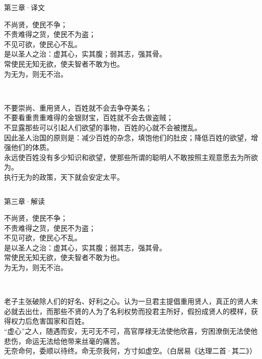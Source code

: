 \documentclass{beamer}
\newcommand{\classical}[1]{\textcolor{classical}{\kaishu #1}}         %
\newcommand{\trans}[1]{\textcolor{trans}{\fangsong #1}}              %
\newcommand{\comment}[1]{\textcolor{comment}{\kaishu #1}}            %
\newcommand{\originaltext}[1]{
	\begin{center}
		\large\classical{#1}
	\end{center}
	}
\begin{document}
\begin{frame}{第三章·译文}
	\originaltext{
	不尚贤，使民不争；\\
	不贵难得之货，使民不为盗；\\
	不见可欲，使民心不乱。\\
	是以圣人之治：虚其心，实其腹；弱其志，强其骨。\\
	常使民无知无欲，使夫智者不敢为也。\\
	为无为，则无不治。
	}
	\begin{columns}[T]
		\trans{\setlength{\parindent}{2em}\\
		不要崇尚、重用贤人，百姓就不会去争夺美名；\\
		不要看重贵重难得的金银财宝，百姓就不会去做盗贼；\\
		不显露那些可以引起人们欲望的事物，百姓的心就不会被搅乱。\\
		因此圣人治国的原则是：减少百姓的杂念，填饱他们的肚皮；降低百姓的欲望，增强他们的体质。\\
		永远使百姓没有多少知识和欲望，使那些所谓的聪明人不敢按照主观意愿去为所欲为。\\
		执行无为的政策，天下就会安定太平。
		}
	\end{columns}
\end{frame}

\begin{frame}{第三章·解读}
	\originaltext{
	不尚贤，使民不争；\\
	不贵难得之货，使民不为盗；\\
	不见可欲，使民心不乱。\\
	是以圣人之治：虚其心，实其腹；弱其志，强其骨。\\
	常使民无知无欲，使夫智者不敢为也。\\
	为无为，则无不治。
	}
	\begin{columns}[T]
		\comment{\setlength{\parindent}{2em}\\
		老子主张破除人们的好名、好利之心。认为一旦君主提倡重用贤人，真正的贤人未必就去出仕，而那些不贤的人为了名利权势而投君主所好，假扮成贤人的模样，获得权力后危害国家和百姓。\\
		“虚心”之人，随遇而安，无可无不可，高官厚禄无法使他欣喜，穷困潦倒无法使他悲伤，命运无法给他带来丝毫的痛苦。\\
		无奈命何，委顺以待终。命无奈我何，方寸如虚空。（白居易《达理二首·其二》）
		}
	\end{columns}
\end{frame}
\end{document}

